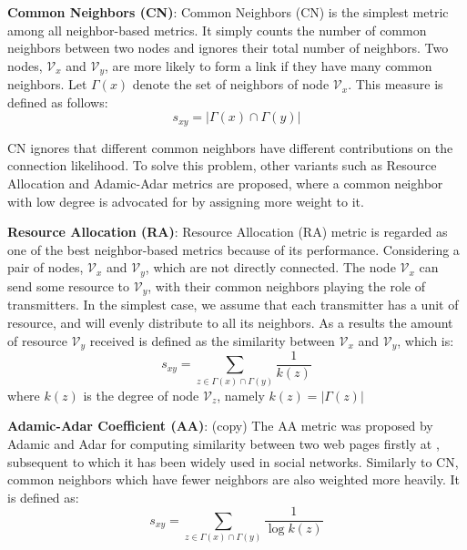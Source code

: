 \documentclass[\main/thesis.tex]{subfiles}
\begin{document}
\textbf{Common Neighbors (CN)}: Common Neighbors (CN) \cite{newman2001clustering} is the simplest metric among all neighbor-based metrics. It simply counts the number of common neighbors between two nodes and ignores their total number of neighbors. Two nodes, $\mathcal{V}_x$ and $\mathcal{V}_y$, are more likely to form a link if they have many common neighbors. Let $\Gamma(x)$ denote the set of neighbors of node $\mathcal{V}_x$. This measure is defined as follows:
\begin{equation}
s_{xy}=|\Gamma(x)\cap\Gamma(y)|
\end{equation}

CN ignores that different common neighbors have different contributions on the connection likelihood. To solve this problem, other variants such as Resource Allocation and Adamic-Adar metrics are proposed, where a common neighbor with low degree is advocated for by assigning more weight to it. 

\textbf{Resource Allocation (RA)}: Resource Allocation (RA) \cite{zhou2009predicting} metric is regarded as one of the best neighbor-based metrics because of its performance. Considering a pair of nodes, $\mathcal{V}_x$ and $\mathcal{V}_y$, which are not directly connected. The node $\mathcal{V}_x$ can send some resource to $\mathcal{V}_y$, with their common neighbors playing the role of transmitters. In the simplest case, we assume that each transmitter has a unit of resource, and will evenly distribute to all its neighbors. As a results the amount of resource $\mathcal{V}_y$ received is defined as the similarity
between $\mathcal{V}_x$ and $\mathcal{V}_y$, which is:
\begin{equation}
s_{xy}=\sum_{z\in \Gamma(x)\cap\Gamma(y)}\frac{1}{k(z)}
\end{equation}
where $k(z)$ is the degree of node $\mathcal{V}_z$, namely $k(z) = |\Gamma(z)|$

\textbf{Adamic-Adar Coefficient (AA)}: (copy) The AA metric was proposed by Adamic and Adar for computing similarity between two web pages firstly at \cite{adamic2003friends}, subsequent to which it has been widely used in social networks. Similarly to CN, common neighbors which have fewer neighbors are also weighted more heavily. It is defined as:
\begin{equation}
s_{xy}=\sum_{z\in \Gamma(x)\cap\Gamma(y)}\frac{1}{\log{k(z)}}
\end{equation}
\end{document}

